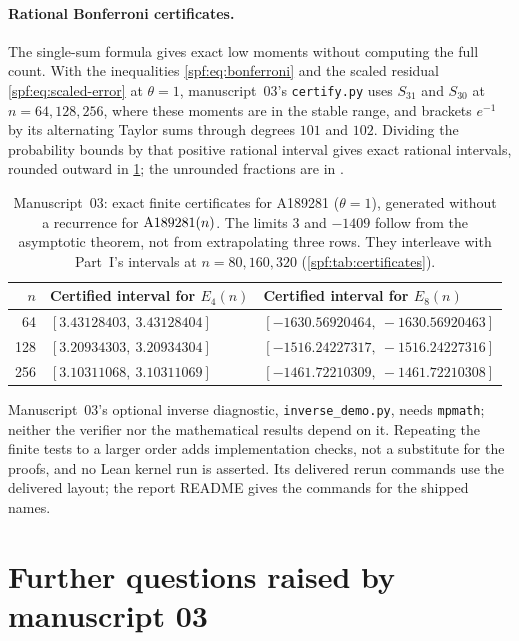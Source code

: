 \documentclass[11pt]{article}
\numberwithin{equation}{section}
\theoremstyle{definition}
\theoremstyle{remark}
\theoremstyle{definition}
\newcommand{\Aone}{\textnormal{A189281}}
\begin{document}
\paragraph{Rational Bonferroni certificates.} The single-sum formula gives
exact low moments without computing the full count. With the inequalities
\eqref{spf:eq:bonferroni} and the scaled residual \eqref{spf:eq:scaled-error}
at $\theta=1$, manuscript~03's \texttt{certify.py} uses $S_{31}$ and $S_{30}$
at $n=64,128,256$, where these moments are in the stable range, and brackets
$e^{-1}$ by its alternating Taylor sums through degrees $101$ and $102$.
Dividing the probability bounds by that positive rational interval gives
exact rational intervals, rounded outward in \cref{spf:rc:tab:certificates};
the unrounded fractions are in .

\begin{table}[htbp]
\centering\small
\renewcommand{\arraystretch}{1.18}
\begin{tabular}{rll}
\toprule
$n$ & Certified interval for $E_4(n)$ & Certified interval for $E_8(n)$\\
\midrule
64 & $[3.43128403,\ 3.43128404]$ & $[-1630.56920464,\ -1630.56920463]$\\
128& $[3.20934303,\ 3.20934304]$ & $[-1516.24227317,\ -1516.24227316]$\\
256& $[3.10311068,\ 3.10311069]$ & $[-1461.72210309,\ -1461.72210308]$\\
\bottomrule
\end{tabular}
\caption{Manuscript~03: exact finite certificates for A189281
($\theta=1$), generated without a recurrence for $\Aone(n)$. The limits $3$
and $-1409$ follow from the asymptotic theorem, not from extrapolating
three rows. They interleave with Part~I's intervals at $n=80,160,320$
(\cref{spf:tab:certificates}).}
\label{spf:rc:tab:certificates}
\end{table}

Manuscript~03's optional inverse diagnostic, \texttt{inverse\_demo.py},
needs \texttt{mpmath}; neither the verifier nor the mathematical results depend on
it. Repeating the finite tests to a larger order adds implementation checks,
not a substitute for the proofs, and no Lean kernel run is asserted. Its
delivered rerun commands use the delivered layout; the report README gives
the commands for the shipped names.

\section{Further questions raised by manuscript 03}
\label{spf:rc:sec:questions}
\end{document}
